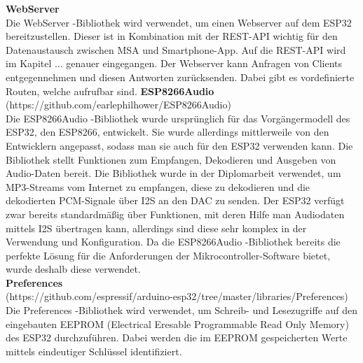 \documentclass[11pt, twoside]{article}
\begin{document}
\vspace{4mm}\newline
\textbf{WebServer} \\
Die \glqq WebServer \grqq{}-Bibliothek wird verwendet, um einen Webserver auf dem ESP32 bereitzustellen. Dieser ist in Kombination mit der REST-API wichtig für den Datenaustausch zwischen MSA und Smartphone-App. Auf die REST-API wird im Kapitel ... genauer eingegangen. Der Webserver kann Anfragen von Clients entgegennehmen und diesen Antworten zurücksenden. Dabei gibt es vordefinierte Routen, welche aufrufbar sind.
\vspace{4mm}\newline
\textbf{ESP8266Audio} \\
(https://github.com/earlephilhower/ESP8266Audio) \\
Die \glqq ESP8266Audio \grqq{} -Bibliothek wurde ursprünglich für das Vorgängermodell des ESP32, den ESP8266, entwickelt. Sie wurde allerdings mittlerweile von den Entwicklern angepasst, sodass man sie auch für den ESP32 verwenden kann. Die Bibliothek stellt Funktionen zum Empfangen, Dekodieren und Ausgeben von Audio-Daten bereit. Die Bibliothek wurde in der Diplomarbeit verwendet, um MP3-Streams vom Internet zu empfangen, diese zu dekodieren und die dekodierten PCM-Signale über I2S an den DAC zu senden. Der ESP32 verfügt zwar bereits standardmäßig über Funktionen, mit deren Hilfe man Audiodaten mittels I2S übertragen kann, allerdings sind diese sehr komplex in der Verwendung und Konfiguration. Da die \glqq ESP8266Audio \grqq{} -Bibliothek bereits die perfekte Lösung für die Anforderungen der Mikrocontroller-Software bietet, wurde deshalb diese verwendet. \newline \\
\textbf{Preferences} \\
(https://github.com/espressif/arduino-esp32/tree/master/libraries/Preferences)
Die \glqq Preferences \grqq{} -Bibliothek wird verwendet, um Schreib- und Lesezugriffe auf den eingebauten EEPROM (Electrical Eresable Programmable Read Only Memory) des ESP32 durchzuführen. Dabei werden die im EEPROM gespeicherten Werte mittels eindeutiger Schlüssel identifiziert.
\end{document}
